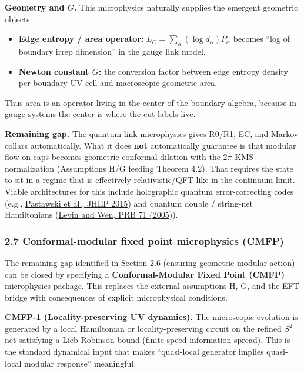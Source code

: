 \documentclass[
]{article}
\providecommand{\tightlist}{%
  \setlength{\itemsep}{0pt}\setlength{\parskip}{0pt}}
\begin{document}
\textbf{Geometry and \(G\).} This microphysics naturally supplies the
emergent geometric objects:

\begin{itemize}
\tightlist
\item
  \textbf{Edge entropy / area operator:}
  \(L_C = \sum_\alpha (\log d_\alpha) P_\alpha\) becomes ``log of
  boundary irrep dimension'' in the gauge link model.
\item
  \textbf{Newton constant \(G\):} the conversion factor between edge
  entropy density per boundary UV cell and macroscopic geometric area.
\end{itemize}

Thus area is an operator living in the center of the boundary algebra,
because in gauge systems the center is where the cut labels live.

\textbf{Remaining gap.} The quantum link microphysics gives R0/R1, EC,
and Markov collars automatically. What it does \textbf{not}
automatically guarantee is that modular flow on caps becomes geometric
conformal dilation with the \(2\pi\) KMS normalization (Assumptions H/G
feeding Theorem 4.2). That requires the state to sit in a regime that is
effectively relativistic/QFT-like in the continuum limit. Viable
architectures for this include holographic quantum error-correcting
codes (e.g., \href{https://arxiv.org/abs/1503.06237}{Pastawski et al.,
JHEP 2015}) and quantum double / string-net Hamiltonians
(\href{https://link.aps.org/doi/10.1103/PhysRevB.71.045110}{Levin and
Wen, PRB 71 (2005)}).

\subsubsection{2.7 Conformal-modular fixed point microphysics
(CMFP)}\label{conformal-modular-fixed-point-microphysics-cmfp}

The remaining gap identified in Section 2.6 (ensuring geometric modular
action) can be closed by specifying a \textbf{Conformal-Modular Fixed
Point (CMFP)} microphysics package. This replaces the external
assumptions H, G, and the EFT bridge with consequences of explicit
microphysical conditions.

\textbf{CMFP-1 (Locality-preserving UV dynamics).} The microscopic
evolution is generated by a local Hamiltonian or locality-preserving
circuit on the refined \(S^2\) net satisfying a Lieb-Robinson bound
(finite-speed information spread). This is the standard dynamical input
that makes ``quasi-local generator implies quasi-local modular
response'' meaningful.
\end{document}
